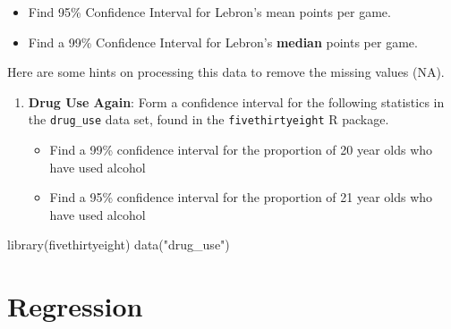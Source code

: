 \documentclass[
]{book}
\newenvironment{Shaded}{\begin{snugshade}}{\end{snugshade}}
\newcommand{\DocumentationTok}[1]{\textcolor[rgb]{0.56,0.35,0.01}{\textbf{\textit{#1}}}}
\newcommand{\FunctionTok}[1]{\textcolor[rgb]{0.00,0.00,0.00}{#1}}
\newcommand{\NormalTok}[1]{#1}
\newcommand{\OtherTok}[1]{\textcolor[rgb]{0.56,0.35,0.01}{#1}}
\newcommand{\SpecialCharTok}[1]{\textcolor[rgb]{0.00,0.00,0.00}{#1}}
\newcommand{\StringTok}[1]{\textcolor[rgb]{0.31,0.60,0.02}{#1}}
\providecommand{\tightlist}{%
  \setlength{\itemsep}{0pt}\setlength{\parskip}{0pt}}
\theoremstyle{definition}
\theoremstyle{definition}
\theoremstyle{definition}
\theoremstyle{definition}
\theoremstyle{remark}
\begin{document}
\begin{enumerate}
  \begin{itemize}
  \tightlist
  \item
    Find 95\% Confidence Interval for Lebron's mean points per game.
  \item
    Find a 99\% Confidence Interval for Lebron's \textbf{median} points per game.
  \end{itemize}
\end{enumerate}

Here are some hints on processing this data to remove the missing values (NA).

\begin{Shaded}
\end{Shaded}

\begin{enumerate}
\def\labelenumi{\arabic{enumi}.}
\setcounter{enumi}{3}
\tightlist
\item
  \textbf{Drug Use Again}: Form a confidence interval for the following statistics in the \texttt{drug\_use} data set, found in the \texttt{fivethirtyeight} R package.

  \begin{itemize}
  \tightlist
  \item
    Find a 99\% confidence interval for the proportion of 20 year olds who have used alcohol
  \item
    Find a 95\% confidence interval for the proportion of 21 year olds who have used alcohol
  \end{itemize}
\end{enumerate}

\begin{Shaded}
\begin{Highlighting}[]
\FunctionTok{library}\NormalTok{(fivethirtyeight)}
\FunctionTok{data}\NormalTok{(}\StringTok{"drug\_use"}\NormalTok{)}
\end{Highlighting}
\end{Shaded}

\hypertarget{part-regression}{%
\part{Regression}\label{part-regression}}
\end{document}
